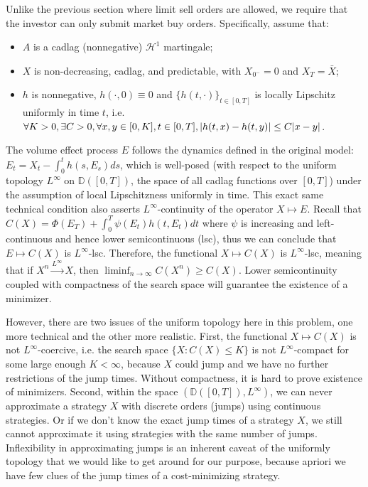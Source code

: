 \documentclass[openany,oneside]{article}
\theoremstyle{definition}
\theoremstyle{remark}
\DeclarePairedDelimiter{\abs}{\lvert}{\rvert} %
\begin{document}
Unlike the previous section where limit sell orders are allowed, we require that the investor can only submit market buy orders. Specifically, assume that:
\begin{itemize}
\item $A$ is a cadlag (nonnegative) $\mathcal{H}^1$ martingale;
\item $X$ is non-decreasing, cadlag, and predictable, with $X_{0^-}=0$ and $X_T = \bar{X}$;
\item $h$ is nonnegative, $h(\cdot, 0)\equiv 0$ and $\{h(t,\cdot)\}_{t\in[0,T]}$ is locally Lipschitz uniformly in time $t$, i.e. $\forall K > 0, \exists C>0, \forall x,y \in [0,K], t\in[0,T], \abs{h(t,x)-h(t,y)} \le C\abs{x-y}$.
\end{itemize}

The volume effect process $E$ follows the dynamics defined in the original model: $E_t = X_t - \int_0^t h(s,E_s) ds$, which is well-posed (with respect to the uniform topology $L^\infty$ on $\mathbb{D}([0,T])$, the space of all cadlag functions over $[0,T]$) under the assumption of local Lipschitzness uniformly in time. This exact same technical condition also asserts $L^\infty$-continuity of the operator $X\mapsto E$. Recall that $C(X) = \Phi(E_T) + \int_0^T \psi(E_t) h(t,E_t) dt$ where $\psi$ is increasing and left-continuous and hence lower semicontinuous (lsc), thus we can conclude that $E\mapsto C(X)$ is $L^\infty$-lsc. Therefore, the functional $X\mapsto C(X)$ is $L^\infty$-lsc, meaning that if $X^n \xrightarrow{L^\infty} X$, then $\liminf_{n\to\infty} C(X^n) \ge C(X)$. Lower semicontinuity coupled with compactness of the search space will guarantee the existence of a minimizer.

However, there are two issues of the uniform topology here in this problem, one more technical and the other more realistic. First, the functional $X\mapsto C(X)$ is not $L^\infty$-coercive, i.e. the search space $\{X:C(X) \le K\}$ is not $L^\infty$-compact for some large enough $K<\infty$, because $X$ could jump and we have no further restrictions of the jump times. Without compactness, it is hard to prove existence of minimizers. Second, within the space $(\mathbb{D}([0,T]), L^\infty)$, we can never approximate a strategy $X$ with discrete orders (jumps) using continuous strategies. Or if we don't know the exact jump times of a strategy $X$, we still cannot approximate it using strategies with the same number of jumps. Inflexibility in approximating jumps is an inherent caveat of the uniformly topology that we would like to get around for our purpose, because apriori we have few clues of the jump times of a cost-minimizing strategy.
\end{document}
